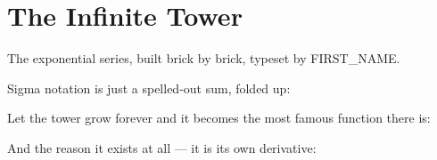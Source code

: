 
\section{The Infinite Tower}

The exponential series, built brick by brick, typeset by {{FIRST_NAME}}.

Sigma notation is just a spelled-out sum, folded up:



Let the tower grow forever and it becomes the most famous function there is:



And the reason it exists at all — it is its own derivative:


